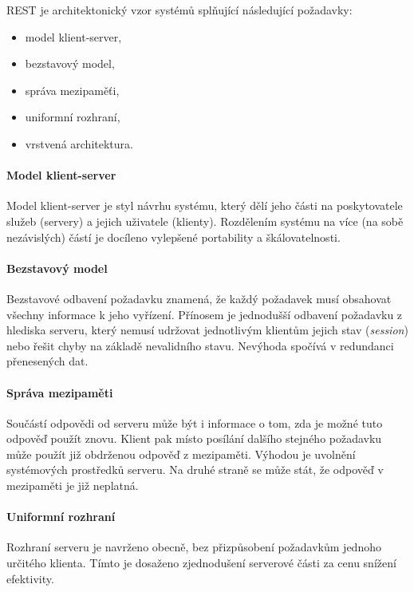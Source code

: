 REST je architektonický vzor systémů splňující následující požadavky:

\begin{itemize}
    \item model klient-server,
    \item bezstavový model,
    \item správa mezipaměťi,
    \item uniformní rozhraní,
    \item vrstvená architektura. \cite{rest}
\end{itemize}

\paragraph{Model klient-server}

Model klient-server je styl návrhu systému, který dělí jeho části na poskytovatele služeb (servery) a jejich uživatele (klienty).
Rozdělením systému na více (na sobě nezávislých) částí je docíleno vylepšené portability a škálovatelnosti.

\paragraph{Bezstavový model}

Bezstavové odbavení požadavku znamená, že každý požadavek musí obsahovat všechny informace k jeho vyřízení.
Přínosem je jednodušší odbavení požadavku z hlediska serveru, který nemusí udržovat jednotlivým klientům jejich stav (\textit{session}) nebo řešit chyby na základě nevalidního stavu.
Nevýhoda spočívá v redundanci přenesených dat.

\paragraph{Správa mezipaměti}

Součástí odpovědi od serveru může být i informace o tom, zda je možné tuto odpověď použít znovu.
Klient pak místo posílání dalšího stejného požadavku může použít již obdrženou odpověď z mezipaměti.
Výhodou je uvolnění systémových prostředků serveru.
Na druhé straně se může stát, že odpověď v mezipaměti je již neplatná.

\paragraph{Uniformní rozhraní}

Rozhraní serveru je navrženo obecně, bez přizpůsobení požadavkům jednoho určitého klienta.
Tímto je dosaženo zjednodušení serverové části za cenu snížení efektivity.

